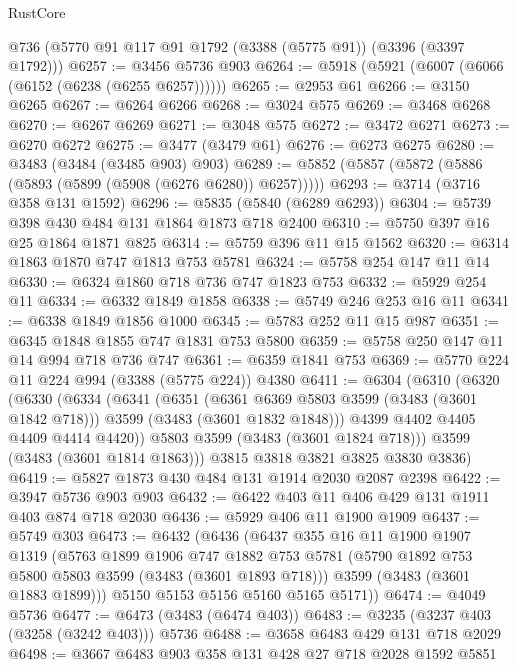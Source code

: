 \begin{lexlean}{RustCore}
\begin{coremodule}
    @736
    (@5770 @91 @117 @91 @1792 (@3388 (@5775 @91)) (@3396 (@3397 @1792)))
@6257 := @3456 @5736 @903
@6264 := @5918 (@5921 (@6007 (@6066 (@6152 (@6238 (@6255 @6257))))))
@6265 := @2953 @61
@6266 := @3150 @6265
@6267 := @6264 @6266
@6268 := @3024 @575
@6269 := @3468 @6268
@6270 := @6267 @6269
@6271 := @3048 @575
@6272 := @3472 @6271
@6273 := @6270 @6272
@6275 := @3477 (@3479 @61)
@6276 := @6273 @6275
@6280 := @3483 (@3484 (@3485 @903) @903)
@6289 := @5852 (@5857 (@5872 (@5886 (@5893 (@5899 (@5908 (@6276 @6280)) @6257)))))
@6293 := @3714 (@3716 @358 @131 @1592)
@6296 := @5835 (@5840 (@6289 @6293))
@6304 := @5739 @398 @430 @484 @131 @1864 @1873 @718 @2400
@6310 := @5750 @397 @16 @25 @1864 @1871 @825
@6314 := @5759 @396 @11 @15 @1562
@6320 := @6314 @1863 @1870 @747 @1813 @753 @5781
@6324 := @5758 @254 @147 @11 @14
@6330 := @6324 @1860 @718 @736 @747 @1823 @753
@6332 := @5929 @254 @11
@6334 := @6332 @1849 @1858
@6338 := @5749 @246 @253 @16 @11
@6341 := @6338 @1849 @1856 @1000
@6345 := @5783 @252 @11 @15 @987
@6351 := @6345 @1848 @1855 @747 @1831 @753 @5800
@6359 := @5758 @250 @147 @11 @14 @994 @718 @736 @747
@6361 := @6359 @1841 @753
@6369 := @5770 @224 @11 @224 @994 (@3388 (@5775 @224)) @4380
@6411 := @6304
    (@6310
      (@6320
        (@6330
          (@6334
            (@6341
              (@6351
                (@6361 @6369 @5803 @3599 (@3483 (@3601 @1842 @718)))
                @3599
                (@3483 (@3601 @1832 @1848)))
              @4399
              @4402
              @4405
              @4409
              @4414
              @4420))
          @5803
          @3599
          (@3483 (@3601 @1824 @718)))
        @3599
        (@3483 (@3601 @1814 @1863)))
      @3815
      @3818
      @3821
      @3825
      @3830
      @3836)
@6419 := @5827 @1873 @430 @484 @131 @1914 @2030 @2087 @2398
@6422 := @3947 @5736 @903 @903
@6432 := @6422 @403 @11 @406 @429 @131 @1911 @403 @874 @718 @2030
@6436 := @5929 @406 @11 @1900 @1909
@6437 := @5749 @303
@6473 := @6432
    (@6436
      (@6437
        @355
        @16
        @11
        @1900
        @1907
        @1319
        (@5763
          @1899
          @1906
          @747
          @1882
          @753
          @5781
          (@5790 @1892 @753 @5800 @5803 @3599 (@3483 (@3601 @1893 @718)))
          @3599
          (@3483 (@3601 @1883 @1899)))
        @5150
        @5153
        @5156
        @5160
        @5165
        @5171))
@6474 := @4049 @5736
@6477 := @6473 (@3483 (@6474 @403))
@6483 := @3235 (@3237 @403 (@3258 (@3242 @403))) @5736
@6488 := @3658 @6483 @429 @131 @718 @2029
@6498 := @3667 @6483 @903 @358 @131 @428 @27 @718 @2028 @1592 @5851

\end{coremodule}
\end{lexlean}
